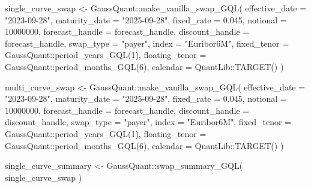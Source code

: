 \documentclass[
  letterpaper,
  DIV=11,
  numbers=noendperiod]{scrreprt}
\newenvironment{Shaded}{\begin{snugshade}}{\end{snugshade}}
\newcommand{\AttributeTok}[1]{\textcolor[rgb]{0.40,0.45,0.13}{#1}}
\newcommand{\DecValTok}[1]{\textcolor[rgb]{0.68,0.00,0.00}{#1}}
\newcommand{\FloatTok}[1]{\textcolor[rgb]{0.68,0.00,0.00}{#1}}
\newcommand{\FunctionTok}[1]{\textcolor[rgb]{0.28,0.35,0.67}{#1}}
\newcommand{\NormalTok}[1]{\textcolor[rgb]{0.00,0.23,0.31}{#1}}
\newcommand{\OtherTok}[1]{\textcolor[rgb]{0.00,0.23,0.31}{#1}}
\newcommand{\SpecialCharTok}[1]{\textcolor[rgb]{0.37,0.37,0.37}{#1}}
\newcommand{\StringTok}[1]{\textcolor[rgb]{0.13,0.47,0.30}{#1}}
\begin{document}
\begin{Shaded}
\begin{Highlighting}[]
\NormalTok{single\_curve\_swap }\OtherTok{\textless{}{-}}\NormalTok{ GaussQuant}\SpecialCharTok{::}\FunctionTok{make\_vanilla\_swap\_GQL}\NormalTok{(}
  \AttributeTok{effective\_date =} \StringTok{"2023{-}09{-}28"}\NormalTok{,}
  \AttributeTok{maturity\_date =} \StringTok{"2025{-}09{-}28"}\NormalTok{,}
  \AttributeTok{fixed\_rate =} \FloatTok{0.045}\NormalTok{,}
  \AttributeTok{notional =} \DecValTok{10000000}\NormalTok{,}
  \AttributeTok{forecast\_handle =}\NormalTok{ forecast\_handle,}
  \AttributeTok{discount\_handle =}\NormalTok{ forecast\_handle,}
  \AttributeTok{swap\_type =} \StringTok{"payer"}\NormalTok{,}
  \AttributeTok{index =} \StringTok{"Euribor6M"}\NormalTok{,}
  \AttributeTok{fixed\_tenor =}\NormalTok{ GaussQuant}\SpecialCharTok{::}\FunctionTok{period\_years\_GQL}\NormalTok{(}\DecValTok{1}\NormalTok{),}
  \AttributeTok{floating\_tenor =}\NormalTok{ GaussQuant}\SpecialCharTok{::}\FunctionTok{period\_months\_GQL}\NormalTok{(}\DecValTok{6}\NormalTok{),}
  \AttributeTok{calendar =}\NormalTok{ QuantLib}\SpecialCharTok{::}\FunctionTok{TARGET}\NormalTok{()}
\NormalTok{)}

\NormalTok{multi\_curve\_swap }\OtherTok{\textless{}{-}}\NormalTok{ GaussQuant}\SpecialCharTok{::}\FunctionTok{make\_vanilla\_swap\_GQL}\NormalTok{(}
  \AttributeTok{effective\_date =} \StringTok{"2023{-}09{-}28"}\NormalTok{,}
  \AttributeTok{maturity\_date =} \StringTok{"2025{-}09{-}28"}\NormalTok{,}
  \AttributeTok{fixed\_rate =} \FloatTok{0.045}\NormalTok{,}
  \AttributeTok{notional =} \DecValTok{10000000}\NormalTok{,}
  \AttributeTok{forecast\_handle =}\NormalTok{ forecast\_handle,}
  \AttributeTok{discount\_handle =}\NormalTok{ discount\_handle,}
  \AttributeTok{swap\_type =} \StringTok{"payer"}\NormalTok{,}
  \AttributeTok{index =} \StringTok{"Euribor6M"}\NormalTok{,}
  \AttributeTok{fixed\_tenor =}\NormalTok{ GaussQuant}\SpecialCharTok{::}\FunctionTok{period\_years\_GQL}\NormalTok{(}\DecValTok{1}\NormalTok{),}
  \AttributeTok{floating\_tenor =}\NormalTok{ GaussQuant}\SpecialCharTok{::}\FunctionTok{period\_months\_GQL}\NormalTok{(}\DecValTok{6}\NormalTok{),}
  \AttributeTok{calendar =}\NormalTok{ QuantLib}\SpecialCharTok{::}\FunctionTok{TARGET}\NormalTok{()}
\NormalTok{)}

\NormalTok{single\_curve\_summary }\OtherTok{\textless{}{-}}\NormalTok{ GaussQuant}\SpecialCharTok{::}\FunctionTok{swap\_summary\_GQL}\NormalTok{(}
\NormalTok{  single\_curve\_swap}
\NormalTok{)}


\end{Highlighting}
\end{Shaded}
\end{document}
